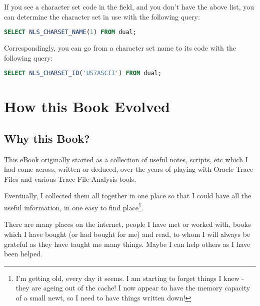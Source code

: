\begin{appendix}
\begin{longtable}[]{@{}rl|rl|rl@{}}
\bottomrule
\end{longtable}

If you see a character set code in the  field, and you don't have the above list, you can determine the character set in use with the following query:

\begin{lstlisting}[language=SQL,caption={SQL Query to Convert a \inline{csi} Code to a Charcter Set Name}]
SELECT NLS_CHARSET_NAME(1) FROM dual;
\end{lstlisting}

Correspondingly, you can go from a character set name to its  code with the following query:

\begin{lstlisting}[language=SQL,caption={SQL Query to Convert a Charcter Set Name to a \inline{csi} Code}]
SELECT NLS_CHARSET_ID('US7ASCII') FROM dual;
\end{lstlisting}

\chapter{How this Book Evolved}
\label{how-this-book-evolved}%

\section{Why this Book?}\label{why-this-book}

This eBook originally started as a collection of useful notes, scripts, etc which I had come across, written or deduced, over the years of playing with Oracle Trace Files and various Trace File Analysis tools.

Eventually, I collected them all together in one place so that I could have all the useful information, in one easy to find place\footnote{I'm getting old, every day it seems. I am starting to forget things I knew - they are ageing out of the cache! I now appear to have the memory capacity of a small newt, so I need to have things written down!}.

There are many places on the internet, people I have met or worked with, books which I have bought (or had bought for me) and read, to whom I will always be grateful as they have taught me many things. Maybe I can help others as I have been helped.


\end{appendix}
